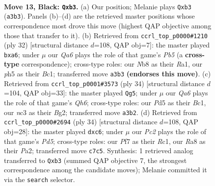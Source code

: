 \documentclass[11pt]{article}
\begin{document}
\clearpage

\begin{figure}[p]\centering
\begin{subfigure}{0.46\textwidth}\centering
\resizebox{\linewidth}{!}{%
\newchessgame
\chessboard[
  setfen={rnb2rk1/ppp2p1p/1n2p1p1/3pP2P/1P1P1PP1/qRN5/P1P5/3QKBNR b K - 2 13},
  showmover=false,
  pgfstyle=straightmove, color=movearrow, markmove={a3-b3}
]}
\caption{}
\end{subfigure}\hfill
\begin{subfigure}{0.46\textwidth}\centering
\resizebox{\linewidth}{!}{%
\newchessgame
\chessboard[
  setfen={r1bqr1k1/1p3pp1/p2p1nnp/1P2p3/2P5/1Q1P1N1P/P3BPP1/R1B1R1K1 w - - 0 17},
  showmover=false,
  pgfstyle=straightmove, color=movearrow, markmove={b5-a6}
]}
\caption{}
\end{subfigure}
\\[4pt]
\begin{subfigure}{0.46\textwidth}\centering
\resizebox{\linewidth}{!}{%
\newchessgame
\chessboard[
  setfen={r2q1rk1/ppp1n1b1/3pP1pQ/4p2p/2P1Pp2/1PN3P1/P4PBP/1RB2RK1 w - - 3 18},
  showmover=false,
  pgfstyle=straightmove, color=movearrow, markmove={h6-g5}
]}
\caption{}
\end{subfigure}\hfill
\begin{subfigure}{0.46\textwidth}\centering
\resizebox{\linewidth}{!}{%
\newchessgame
\chessboard[
  setfen={r3qrk1/1p1bp2p/p2p2p1/2pP1p2/1PPQn3/5NP1/P3PPBP/2R1R1K1 w - c6 0 18},
  showmover=false,
  pgfstyle=straightmove, color=movearrow, markmove={d5-c6}
]}
\caption{}
\end{subfigure}
\caption{\textbf{Move 13, Black: \texttt{Qxb3}.} (a) Our position; Melanie plays \texttt{Qxb3} (\texttt{a3b3}). Panels (b)--(d) are the retrieved master positions whose correspondence most drove this move (highest QAP objective among those that transfer to it). (b) Retrieved from \texttt{ccrl\_top\_p0000\#1210} (ply 32) [structural distance $d$=108, QAP obj=7]: the master played \texttt{bxa6}; under $\mu$ our \emph{Qa6} plays the role of that game's \emph{Pb5} (a \textbf{cross-type} correspondence); cross-type roles: our \emph{N}b8 as their \emph{R}a1, our \emph{p}h5 as their \emph{B}c1; transferred move \texttt{a3b3} \textbf{(endorses this move)}. (c) Retrieved from \texttt{ccrl\_top\_p0001\#3573} (ply 34) [structural distance $d$=104, QAP obj=33]: the master played \texttt{Qg5}; under $\mu$ our \emph{Qa6} plays the role of that game's \emph{Qh6}; cross-type roles: our \emph{P}d5 as their \emph{B}c1, our \emph{n}c3 as their \emph{B}g2; transferred move \texttt{a3b2}. (d) Retrieved from \texttt{ccrl\_top\_p0000\#2694} (ply 34) [structural distance $d$=108, QAP obj=28]: the master played \texttt{dxc6}; under $\mu$ our \emph{Pc2} plays the role of that game's \emph{Pd5}; cross-type roles: our \emph{P}f7 as their \emph{R}c1, our \emph{R}a8 as their \emph{P}a2; transferred move \texttt{c7c5}. Synthesis: 1 retrieved analog transferred to \texttt{Qxb3} (summed QAP objective 7, the strongest correspondence among the candidate moves); Melanie committed it via the \texttt{search} selector.}
\label{fig:thought-m25}
\end{figure}
\end{document}
